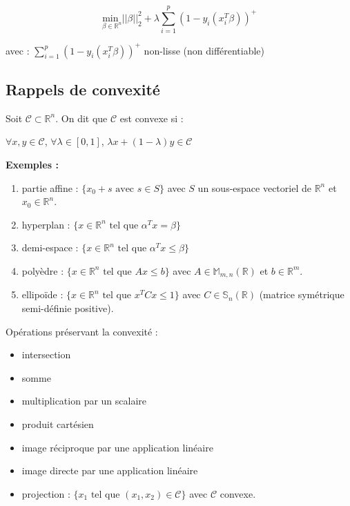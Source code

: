 \documentclass[12pt,a4paper]{article}
\newcommand{\propriete}[2]{%
    \begin{tcolorbox}[colback=white,colframe=green!25!white,title=\textbf{Propriété #1}, coltitle=black]
        #2
    \end{tcolorbox}
}
\newcommand{\definition}[2]{%
    \begin{tcolorbox}[colback=white,colframe=blue!25!white,title=\textbf{Définition #1}, coltitle=black]
        #2
    \end{tcolorbox}
}
\begin{document}
\begin{equation}
    \underset{\beta \in \mathbb{R}^n}{\text{min }} ||\beta||_2^2 + \lambda  \sum_{i=1}^p (1 - y_i (x_i^T \beta))^+
\end{equation}

avec : $\sum_{i=1}^p (1 - y_i (x_i^T \beta))^+$ non-lisse (non différentiable)\\



\subsection{Rappels de convexité}

\definition{}{Soit $\mathcal{C} \subset \mathbb{R}^n$. On dit que $\mathcal{C}$ est convexe si :
\begin{center}
    $\forall x, y \in \mathcal{C}$, $\forall \lambda \in [0, 1]$, $\lambda x + (1 - \lambda) y \in \mathcal{C}$
\end{center}
}


\noindent\textbf{Exemples :}
\begin{enumerate}[label=\roman*)]
    \item partie affine : $\{x_0 + s \text{ avec } s \in S\}$ avec $S$ un sous-espace vectoriel de $\mathbb{R}^n$ et $x_0 \in \mathbb{R}^n$.
    \item hyperplan : $\{x \in \mathbb{R}^n \text{ tel que } \alpha^T x = \beta\}$
    \item demi-espace : $\{x \in \mathbb{R}^n \text{ tel que } \alpha^T x \leq \beta\}$
    \item polyèdre : $\{x \in \mathbb{R}^n \text{ tel que } Ax \leq b\}$ avec $A \in \mathbb{M}_{m,n}(\mathbb{R})$ et $b \in \mathbb{R}^m$.
    \item ellipoïde : $\{x \in \mathbb{R}^n \text{ tel que } x^TCx \leq 1\}$ avec $C \in \mathbb{S}_n(\mathbb{R})$ (matrice symétrique semi-définie positive).\\
\end{enumerate}


\propriete{}{Opérations préservant la convexité :
    \begin{itemize}
        \item intersection
        \item somme
        \item multiplication par un scalaire
        \item produit cartésien
        \item image réciproque par une application linéaire
        \item image directe par une application linéaire
        \item projection : $\{x_1 \text{ tel que } (x_1, x_2) \in \mathcal{C}\}$ avec $\mathcal{C}$ convexe.
    \end{itemize}
}
\end{document}
